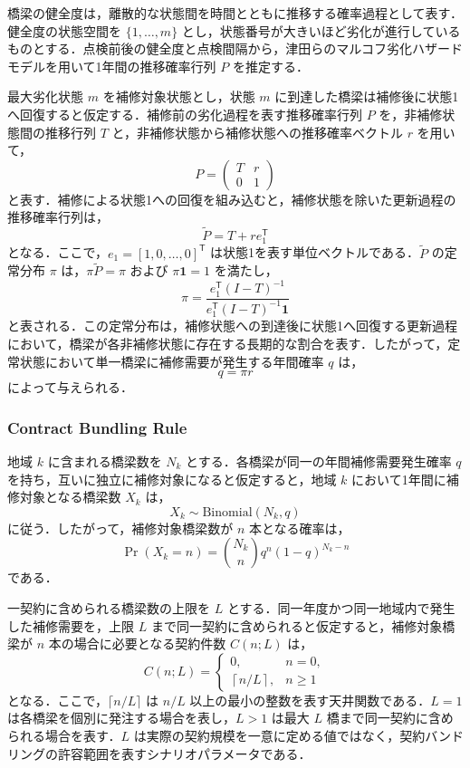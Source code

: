 \documentclass[Journal,letterpaper,InsideFigs,NoLineNumbers]{ascelike-new}
\begin{document}
橋梁の健全度は，離散的な状態間を時間とともに推移する確率過程として表す．健全度の状態空間を \(\{1,\ldots,m\}\) とし，状態番号が大きいほど劣化が進行しているものとする．点検前後の健全度と点検間隔から，津田ら\cite{tsuda2005}のマルコフ劣化ハザードモデルを用いて1年間の推移確率行列 \(P\) を推定する．

最大劣化状態 \(m\) を補修対象状態とし，状態 \(m\) に到達した橋梁は補修後に状態1へ回復すると仮定する．補修前の劣化過程を表す推移確率行列 \(P\) を，非補修状態間の推移行列 \(T\) と，非補修状態から補修状態への推移確率ベクトル \(r\) を用いて，
\[
P=
\left(
\begin{array}{cc}
T & r\\
0 & 1
\end{array}
\right)
\]
と表す．補修による状態1への回復を組み込むと，補修状態を除いた更新過程の推移確率行列は，
\[
\widetilde{P}=T+re_1^{\mathsf T}
\]
となる．ここで，\(e_1=[1,0,\ldots,0]^{\mathsf T}\) は状態1を表す単位ベクトルである．\(\widetilde{P}\) の定常分布 \(\pi\) は，\(\pi\widetilde{P}=\pi\) および \(\pi\mathbf{1}=1\) を満たし，
\[
\pi=
\frac{e_1^{\mathsf T}(I-T)^{-1}}
{e_1^{\mathsf T}(I-T)^{-1}\mathbf{1}}
\]
と表される．この定常分布は，補修状態への到達後に状態1へ回復する更新過程において，橋梁が各非補修状態に存在する長期的な割合を表す．したがって，定常状態において単一橋梁に補修需要が発生する年間確率 \(q\) は，
\[
q=\pi r
\]
によって与えられる．

\subsubsection{Contract Bundling Rule}

地域 \(k\) に含まれる橋梁数を \(N_k\) とする．各橋梁が同一の年間補修需要発生確率 \(q\) を持ち，互いに独立に補修対象になると仮定すると，地域 \(k\) において1年間に補修対象となる橋梁数 \(X_k\) は，
\[
X_k\sim\mathrm{Binomial}(N_k,q)
\]
に従う．したがって，補修対象橋梁数が \(n\) 本となる確率は，
\[
\Pr(X_k=n)
=
{N_k\choose n}q^n(1-q)^{N_k-n}
\]
である．

一契約に含められる橋梁数の上限を \(L\) とする．同一年度かつ同一地域内で発生した補修需要を，上限 \(L\) まで同一契約に含められると仮定すると，補修対象橋梁が \(n\) 本の場合に必要となる契約件数 \(C(n;L)\) は，
\[
C(n;L)=
\left\{
\begin{array}{ll}
0, & n=0,\\
\left\lceil n/L\right\rceil, & n\geq 1
\end{array}
\right.
\]
となる．ここで，\(\lceil n/L\rceil\) は \(n/L\) 以上の最小の整数を表す天井関数である．\(L=1\) は各橋梁を個別に発注する場合を表し，\(L>1\) は最大 \(L\) 橋まで同一契約に含められる場合を表す．\(L\) は実際の契約規模を一意に定める値ではなく，契約バンドリングの許容範囲を表すシナリオパラメータである．
\end{document}
